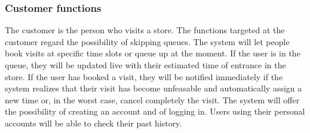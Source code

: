 \subsubsection{Customer functions}
The customer is the person who visits a store.
The functions targeted at the customer regard the possibility of skipping queues.
The system will let people book visits at specific time slots or queue up at the moment.
If the user is in the queue, they will be updated live with their estimated time of entrance in the store.
If the user has booked a visit, they will be notified immediately if the system realizes that
their visit has become unfeasable and automatically assign a new time or, in the worst case, cancel completely the visit.
The system will offer the possibility of creating an account and of logging in.
Users using their personal accounts will be able to check their past history.

